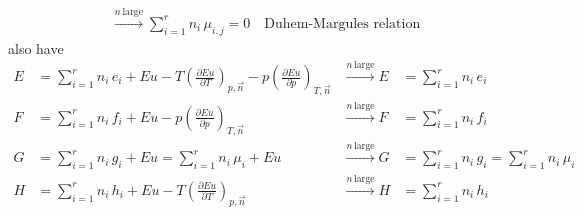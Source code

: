 \begin{thm}
\begin{align*}
        &\xrightarrow{n \, \text{large}} \sum_{i=1}^r n_i \, \mu_{i,j} = 0
        \quad \boxed{\text{Duhem-Margules relation}}
    \end{align*}
    also have
    \begin{align*}
        E &= \sum_{i=1}^r n_i \, e_i + E u - T \left( \frac{\partial E u}{\partial T} \right)_{p,\vec{n}} 
        - p \left( \frac{\partial E u}{\partial p} \right)_{T,\vec{n}} 
        &\xrightarrow{n \, \text{large}}E &= \sum_{i=1}^r n_i \, e_i \\
        F &= \sum_{i=1}^r n_i \, f_i + E u - p \left( \frac{\partial E u}{\partial p} \right)_{T,\vec{n}} 
        &\xrightarrow{n \, \text{large}}F &= \sum_{i=1}^r n_i \, f_i \\
        G &= \sum_{i=1}^r n_i \, g_i + E u = \sum_{i=1}^r n_i \, \mu_i + E u 
        &\xrightarrow{n \, \text{large}}G &= \sum_{i=1}^r n_i \, g_i = \sum_{i=1}^r n_i \, \mu_i \\
        H &= \sum_{i=1}^r n_i \, h_i + E u - T \left( \frac{\partial E u}{\partial T} \right)_{p,\vec{n}} 
        &\xrightarrow{n \, \text{large}}H &= \sum_{i=1}^r n_i \, h_i
    \end{align*}
\end{thm}
